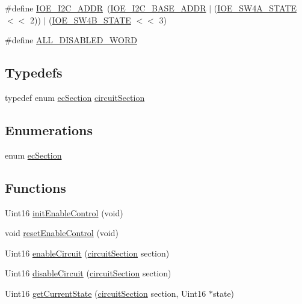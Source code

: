 \begin{DoxyCompactItemize}
\item 
\#define \hyperlink{a00023_ad615a329bea187ce779cf9930ba8a6fa}{I\-O\-E\-\_\-\-I2\-C\-\_\-\-A\-D\-D\-R}~(\hyperlink{a00023_ab848e49bf7c4ea73e4ef05f26b3c60e8}{I\-O\-E\-\_\-\-I2\-C\-\_\-\-B\-A\-S\-E\-\_\-\-A\-D\-D\-R} $|$ (\hyperlink{a00023_a0cfe7137edc026282b36312077954701}{I\-O\-E\-\_\-\-S\-W4\-A\-\_\-\-S\-T\-A\-T\-E} $<$$<$ 2)) $|$ (\hyperlink{a00023_a5704aece7ac84dbd34e918fc0c60108d}{I\-O\-E\-\_\-\-S\-W4\-B\-\_\-\-S\-T\-A\-T\-E} $<$$<$ 3)
\item 
\#define \hyperlink{a00023_a79846f375935e81b3781b88b40405d38}{A\-L\-L\-\_\-\-D\-I\-S\-A\-B\-L\-E\-D\-\_\-\-W\-O\-R\-D}
\end{DoxyCompactItemize}
\subsection*{Typedefs}
\begin{DoxyCompactItemize}
\item 
typedef enum \hyperlink{a00023_a693dd7ac614cd1a7f8bfd7440f34ed6f}{ec\-Section} \hyperlink{a00023_a5d2cb2e2fccefcdcb2e72e9e88b94223}{circuit\-Section}
\end{DoxyCompactItemize}
\subsection*{Enumerations}
\begin{DoxyCompactItemize}
\item 
enum \hyperlink{a00023_a693dd7ac614cd1a7f8bfd7440f34ed6f}{ec\-Section} 
\end{DoxyCompactItemize}
\subsection*{Functions}
\begin{DoxyCompactItemize}
\item 
Uint16 \hyperlink{a00023_ae6fd4f744738c8b2733ef36d92fb7313}{init\-Enable\-Control} (void)
\item 
void \hyperlink{a00023_a7e7f2b9153314c4652c5e0a1d2977133}{reset\-Enable\-Control} (void)
\item 
Uint16 \hyperlink{a00023_a5f4a447d1fbeba7920434b60e33b521e}{enable\-Circuit} (\hyperlink{a00023_a5d2cb2e2fccefcdcb2e72e9e88b94223}{circuit\-Section} section)
\item 
Uint16 \hyperlink{a00023_a606ff8e8b51f82c70ced419dad90f993}{disable\-Circuit} (\hyperlink{a00023_a5d2cb2e2fccefcdcb2e72e9e88b94223}{circuit\-Section} section)
\item 
Uint16 \hyperlink{a00023_a82da7573b42f3476655e4e7fc7cb4440}{get\-Current\-State} (\hyperlink{a00023_a5d2cb2e2fccefcdcb2e72e9e88b94223}{circuit\-Section} section, Uint16 $\ast$state)
\end{DoxyCompactItemize}


